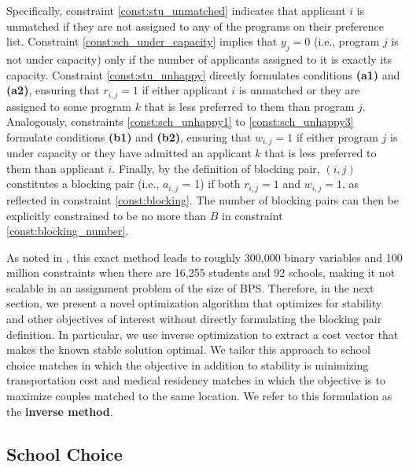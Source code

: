 \documentclass[11pt]{article}
\begin{document}
Specifically, constraint \eqref{const:stu_unmatched} indicates that applicant $i$ is unmatched if they are not assigned to any of the programs on their preference list. Constraint \eqref{const:sch_under_capacity} implies that $y_j = 0$ (i.e., program $j$ is not under capacity) only if the number of applicants assigned to it is exactly its capacity.
Constraint \eqref{const:stu_unhappy} directly formulates conditions {\bf  (a1)} and {\bf  (a2)}, ensuring that $r_{i,j} =1$ if either applicant $i$ is unmatched or they are assigned to some program $k$ that is less preferred to them than program $j$. Analogously, constraints \eqref{const:sch_unhappy1} to \eqref{const:sch_unhappy3} formulate conditions {\bf  (b1)} and {\bf  (b2)}, ensuring that $w_{i,j} =1$ if either program $j$ is under capacity or they have admitted an applicant $k$ that is less preferred to them than applicant $i$.
Finally, by the definition of blocking pair, $(i,j)$ constitutes a blocking pair (i.e., $a_{i,j}$ = 1) if both $r_{i,j} = 1$ and $w_{i,j} =1$, as reflected in constraint \eqref{const:blocking}. The number of blocking pairs can then be explicitly constrained to be no more than $B$ in constraint \eqref{const:blocking_number}. 

As noted in \cite{papalexopoulos2022}, this exact method leads to roughly 300,000 binary variables and 100 million constraints when there are 16,255 students and 92 schools, making it not scalable in an assignment problem of the size of BPS. 
Therefore, in the next section, we present a novel optimization algorithm that optimizes for stability and other objectives of interest without directly formulating the blocking pair definition. In particular, we use inverse optimization to extract a cost vector that makes the known stable solution optimal. We tailor this approach to school choice matches in which the objective in addition to stability is minimizing transportation cost and medical residency matches in which the objective is to maximize couples matched to the same location. We refer to this formulation as the {\bf  inverse method}.


\subsection{School Choice}
\end{document}
